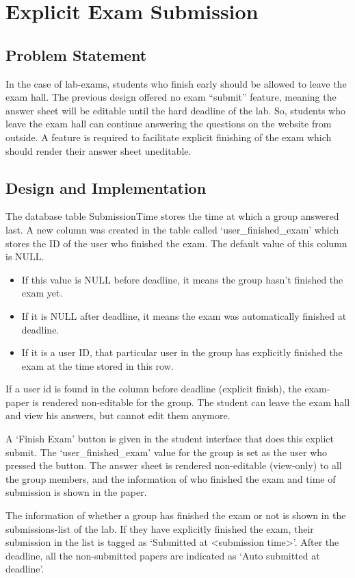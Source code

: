 \section{Explicit Exam Submission}

\subsection{Problem Statement}
In the case of lab-exams, students who finish early should be allowed to leave the exam hall. The previous design offered no exam ``submit'' feature, meaning the answer sheet will be editable until the hard deadline of the lab. So, students who leave the exam hall can continue answering the questions on the website from outside. A feature is required to facilitate explicit finishing of the exam which should render their answer sheet uneditable.

\subsection{Design and Implementation}
The database table SubmissionTime stores the time at which a group answered last. A new column was created in the table called `user\_finished\_exam' which stores the ID of the user who finished the exam. The default value of this column is NULL.
\begin{itemize}
\item If this value is NULL before deadline, it means the group hasn't finished the exam yet.
\item If it is NULL after deadline, it means the exam was automatically finished at deadline.
\item If it is a user ID, that particular user in the group has explicitly finished the exam at the time stored in this row.
\end{itemize}

If a user id is found in the column before deadline (explicit finish), the exam-paper is rendered non-editable for the group. The student can leave the exam hall and view his answers, but cannot edit them anymore.

A `Finish Exam' button is given in the student interface that does this explict submit. The `user\_finished\_exam' value for the group is set as the user who pressed the button. The answer sheet is rendered non-editable (view-only) to all the group members, and the information of who finished the exam and time of submission is shown in the paper.

The information of whether a group has finished the exam or not is shown in the submissions-list of the lab. If they have explicitly finished the exam, their submission in the list is tagged as `Submitted at \textless submission time\textgreater'. After the deadline, all the non-submitted papers are indicated as `Auto submitted at deadline'.
